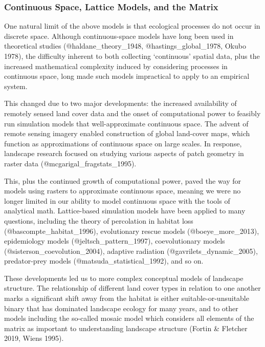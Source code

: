 \hypertarget{continuous-space-lattice-models-and-the-matrix}{%
\subsubsection{Continuous Space, Lattice Models, and the
Matrix}\label{continuous-space-lattice-models-and-the-matrix}}

One natural limit of the above models is that ecological processes do
not occur in discrete space. Although continuous-space models have long
been used in theoretical studies (@haldane\_theory\_1948,
@hastings\_global\_1978, Okubo 1978), the difficulty inherent to both
collecting `continuous' spatial data, plus the increased mathematical
complexity induced by considering processes in continuous space, long
made such models impractical to apply to an empirical system.

This changed due to two major developments: the increased availability
of remotely sensed land cover data and the onset of computational power
to feasibly run simulation models that well-approximate continuous
space. The advent of remote sensing imagery enabled construction of
global land-cover maps, which function as approximations of continuous
space on large scales. In response, landscape research focused on
studying various aspects of patch geometry in raster data
(@mcgarigal\_fragstats\_1995).

This, plus the continued growth of computational power, paved the way
for models using rasters to approximate continuous space, meaning we
were no longer limited in our ability to model continuous space with the
tools of analytical math. Lattice-based simulation models have been
applied to many questions, including the theory of percolation in
habitat loss (@bascompte\_habitat\_1996), evolutionary rescue models
(@boeye\_more\_2013), epidemiology models (@jeltsch\_pattern\_1997),
coevolutionary models (@sisterson\_coevolution\_2004), adaptive
radiation (@gavrilets\_dynamic\_2005), predator-prey models
(@matsuda\_statistical\_1992), and so on.

These developments led us to more complex conceptual models of landscape
structure. The relationship of different land cover types in relation to
one another marks a significant shift away from the habitat is either
suitable-or-unsuitable binary that has dominated landscape ecology for
many years, and to other models including the so-called mosaic model
which considers all elements of the matrix as important to understanding
landscape structure (Fortin \& Fletcher 2019, Wiens 1995).

